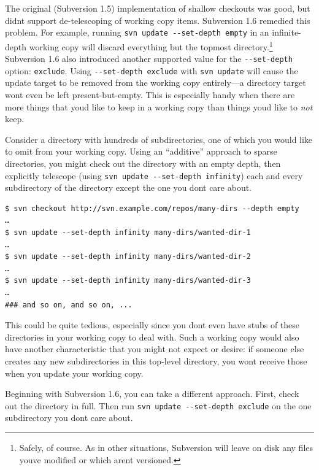 The original (Subversion 1.5) implementation of shallow checkouts was
good, but didn\textquotesingle t support de-telescoping of working copy
items. Subversion 1.6 remedied this problem. For example, running
\texttt{svn\ update\ -\/-set-depth\ empty} in an infinite-depth working
copy will discard everything but the topmost directory.\footnote{Safely,
  of course. As in other situations, Subversion will leave on disk any
  files you\textquotesingle ve modified or which aren\textquotesingle t
  versioned.} Subversion 1.6 also introduced another supported value for
the \texttt{-\/-set-depth} option: \texttt{exclude}. Using
\texttt{-\/-set-depth\ exclude} with \texttt{svn\ update} will cause the
update target to be removed from the working copy entirely---a directory
target won\textquotesingle t even be left present-but-empty. This is
especially handy when there are more things that you\textquotesingle d
like to keep in a working copy than things you\textquotesingle d like to
\emph{not} keep.

Consider a directory with hundreds of subdirectories, one of which you
would like to omit from your working copy. Using an ``additive''
approach to sparse directories, you might check out the directory with
an empty depth, then explicitly telescope (using
\texttt{svn\ update\ -\/-set-depth\ infinity}) each and every
subdirectory of the directory except the one you don\textquotesingle t
care about.

\begin{verbatim}
$ svn checkout http://svn.example.com/repos/many-dirs --depth empty
…
$ svn update --set-depth infinity many-dirs/wanted-dir-1
…
$ svn update --set-depth infinity many-dirs/wanted-dir-2
…
$ svn update --set-depth infinity many-dirs/wanted-dir-3
…
### and so on, and so on, ...
\end{verbatim}

This could be quite tedious, especially since you don\textquotesingle t
even have stubs of these directories in your working copy to deal with.
Such a working copy would also have another characteristic that you
might not expect or desire: if someone else creates any new
subdirectories in this top-level directory, you won\textquotesingle t
receive those when you update your working copy.

Beginning with Subversion 1.6, you can take a different approach. First,
check out the directory in full. Then run
\texttt{svn\ update\ -\/-set-depth\ exclude} on the one subdirectory you
don\textquotesingle t care about.

